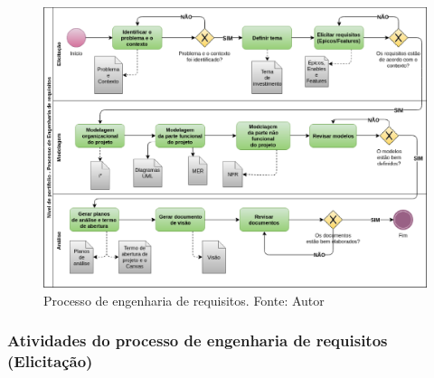 \begin{figure}[h!]
	\centering
  \includegraphics[keepaspectratio=true,scale=0.5]{figuras/requisitos.eps}
  \caption[Processo de engenharia de requisitos.]{Processo de engenharia de requisitos. Fonte: Autor}
	\label{fig:requisitos}
\end{figure}

\subsubsection{Atividades do processo de engenharia de requisitos (Elicitação)}

